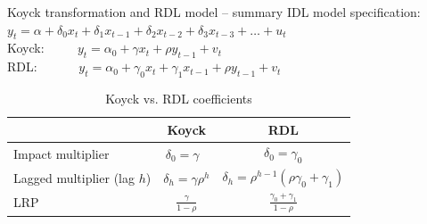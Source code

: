 \documentclass{beamer}
\begin{document}
\begin{frame}{Koyck transformation and RDL model -- summary}
IDL model specification:\\ \smallskip
$y_t = \alpha + \delta_0 x_t  + \delta_1 x_{t-1} + \delta_2 x_{t-2} + \delta_3 x_{t-3}+ \dots + u_t $\\
\bigskip
Koyck: $\qquad \,\, y_t = \alpha_0 + \gamma x_t + \rho y_{t-1} + v_t$\\
\smallskip
RDL: $\qquad \quad y_t = \alpha_0+\gamma_0 x_t +\gamma_1 x_{t-1} + \rho y_{t-1}  + v_t $\\
\bigskip
\begin{table}
\centering
\caption{Koyck vs. RDL coefficients}
\label{Tab1}
\begin{tabular}{|l|c|c|}
\hline
  & Koyck & RDL \\
  \hline 
Impact multiplier & $\delta_0=\gamma~~~$ & $\delta_0=\gamma_0$ \\
\hline
Lagged multiplier (lag $h$) & $\delta_h = \gamma \rho^h$ & $\delta_h = \rho^{h-1}(\rho \gamma_0 + \gamma_1)$ \\
\hline 
LRP & $\frac{\gamma}{1-\rho}$ & $\frac{\gamma_0 + \gamma_1}{1-\rho}$\\
\hline
\end{tabular}
\end{table} 
\end{frame}
\end{document}

